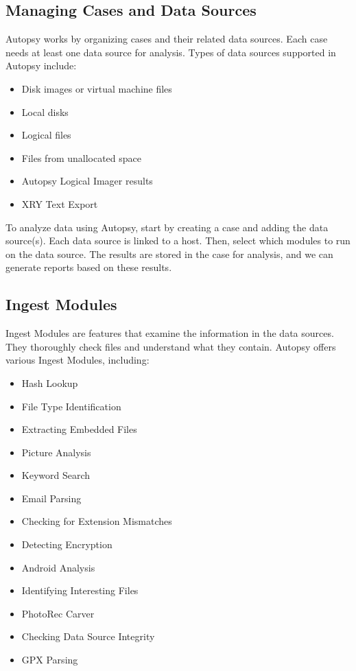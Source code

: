 \documentclass{extarticle}
\begin{document}
\subsection{Managing Cases and Data Sources}
Autopsy works by organizing cases and their related data sources. Each case needs at least one data source for analysis. Types of data sources supported in Autopsy include:
\begin{itemize}
    \item Disk images or virtual machine files
    \item Local disks
    \item Logical files
    \item Files from unallocated space
    \item Autopsy Logical Imager results
    \item XRY Text Export
\end{itemize}
To analyze data using Autopsy, start by creating a case and adding the data source(s). Each data source is linked to a host. Then, select which modules to run on the data source. The results are stored in the case for analysis, and we can generate reports based on these results.

\subsection{Ingest Modules}

Ingest Modules are features that examine the information in the data sources. They thoroughly check files and understand what they contain.
Autopsy offers various Ingest Modules, including:

\begin{itemize}
    \item Hash Lookup
    \item File Type Identification
    \item Extracting Embedded Files
    \item Picture Analysis
    \item Keyword Search
    \item Email Parsing
    \item Checking for Extension Mismatches
    \item Detecting Encryption
    \item Android Analysis
    \item Identifying Interesting Files
    \item PhotoRec Carver
    \item Checking Data Source Integrity
    \item GPX Parsing
\end{itemize}
\end{document}
